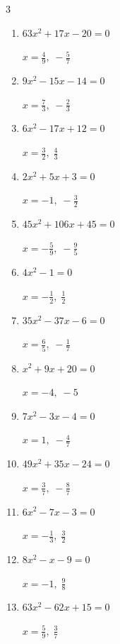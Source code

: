 \begin{multicols}{3}
\begin{enumerate}
  \item $63x^{2}+17x-20=0$

        $\displaystyle x=\frac{4}{9},\; -\frac{5}{7}$

  \item $9x^{2}-15x-14=0$

        $\displaystyle x=\frac{7}{3},\; -\frac{2}{3}$

  \item $6x^{2}-17x+12=0$

        $\displaystyle x=\frac{3}{2},\; \frac{4}{3}$

\columnbreak %

  \item $2x^{2}+5x+3=0$

        $\displaystyle x=-1,\; -\frac{3}{2}$

  \item $45x^{2}+106x+45=0$

        $\displaystyle x=-\frac{5}{9},\; -\frac{9}{5}$

  \item $4x^{2}-1=0$

        $\displaystyle x=-\frac{1}{2},\; \frac{1}{2}$

  \item $35x^{2}-37x-6=0$

        $\displaystyle x=\frac{6}{5},\; -\frac{1}{7}$

  \item $x^{2}+9x+20=0$

        $\displaystyle x=-4,\; -5$

  \item $7x^{2}-3x-4=0$

        $\displaystyle x=1,\; -\frac{4}{7}$

  \item $49x^{2}+35x-24=0$

        $\displaystyle x=\frac{3}{7},\; -\frac{8}{7}$

  \item $6x^{2}-7x-3=0$

        $\displaystyle x=-\frac{1}{3},\; \frac{3}{2}$

  \item $8x^{2}-x-9=0$

        $\displaystyle x=-1,\; \frac{9}{8}$

  \item $63x^{2}-62x+15=0$

        $\displaystyle x=\frac{5}{9},\; \frac{3}{7}$


\end{enumerate}
\end{multicols}
